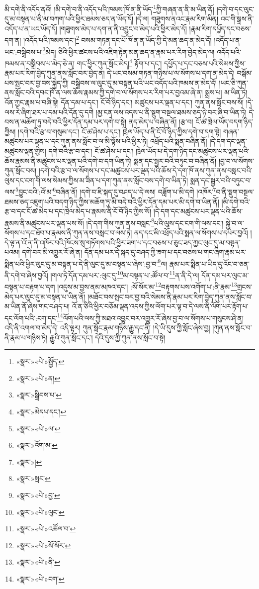 མི་དགེ་ནི་འདོད་ནའོ། །མི་དགེ་བ་ནི་འདོད་པའི་ཁམས་ཁོ་ན་ནི་ཡོད་\footnote{«སྣར་»«པེ་»སྤྱོད་}ཀྱི་གཞན་ན་ནི་མ་ཡིན་ནོ། །དགེ་བ་དང་ལུང་དུ་མ་བསྟན་པ་ནི་མ་བཀག་པའི་ཕྱིར་ཐམས་ཅད་ན་ཡོད་དོ། །དེ་ལ། གཟུགས་ནའང་རྣམ་རིག་མིན། འང་གི་སྒྲས་ནི་འདོད་པ་ན་ཡང་ཡོད་དོ། །གཟུགས་མེད་པ་དག་ན་ནི་འབྱུང་བ་མེད་པའི་ཕྱིར་མེད་དོ། །རྣམ་རིག་དཔྱོད་དང་བཅས་དག་ན། །འདོད་པའི་ཁམས་དང་།\footnote{«སྣར་»«པེ་»ན།} བསམ་གཏན་དང་པོ་ཁོ་ན་ན་ཡོད་ཀྱི་དེ་མན་ཆད་ན་མེད་དོ། །འདོད་པ་ན་ཡང་:བསྒྲིབས་པ་\footnote{«སྣར་»སྒྲིབས་པ་}མེད། ཅིའི་ཕྱིར་ཚངས་པའི་འཇིག་རྟེན་མན་ཆད་ན་རྣམ་པར་རིག་བྱེད་མེད་ལ། འདོད་པའི་ཁམས་ན་བསྒྲིབས་པ་མེད་ཅེ་ན། གང་ཕྱིར་ཀུན་སློང་མེད།\footnote{«སྣར་»མེདཔ་དང་།} རྟོག་པ་དང་། དཔྱོད་པ་དང་བཅས་པའི་སེམས་ཀྱིས་རྣམ་པར་རིག་བྱེད་ཀུན་ནས་སློང་བར་བྱེད་ན། དེ་ཡང་བསམ་གཏན་གཉིས་པ་ལ་སོགས་པ་དག་ན་མེད་དེ། བསྒོམ་པས་སྤང་བར་བྱ་བས་སྐྱེད་ཀྱི། བསྒྲིབས་ལ་ལུང་དུ་མ་བསྟན་པའི་ཡང་འདོད་པའི་ཁམས་ན་མེད་དོ། །ཡང་ཅི་ཀུན་ནས་སློང་བའི་དབང་ཁོ་ན་ལས་ཆོས་རྣམས་ཀྱི་དགེ་བ་ལ་སོགས་པར་རིག་པར་བྱའམ་ཞེ་ན། སྨྲས་པ། མ་ཡིན་ཏེ། འོན་ཀྱང་རྣམ་པ་བཞི་སྟེ། དོན་དམ་པ་དང་། ངོ་བོ་ཉིད་དང་། མཚུངས་པར་ལྡན་པ་དང་། ཀུན་ནས་སློང་བས་སོ། །དེ་ལས་རེ་ཞིག་ཐར་པ་དམ་པའི་དོན་དུ་དགེ །མྱ་ངན་ལས་འདས་པ་ནི་སྡུག་བསྔལ་ཐམས་ཅད་ཉེ་བར་ཞི་བ་ཡིན་ཏེ། དེ་བས་ན་མཆོག་ཏུ་བདེ་བའི་ཕྱིར་དོན་དམ་པར་དགེ་བ་སྟེ། ནད་མེད་པ་བཞིན་ནོ། །རྩ་བ། ངོ་ཚ་ཁྲེལ་ཡོད་བདག་ཉིད་ཀྱིས། །དགེ་བའི་རྩ་བ་གསུམ་དང་། ངོ་ཚ་ཤེས་པ་དང་། ཁྲེལ་ཡོད་པ་ནི་ངོ་བོ་ཉིད་ཀྱིས་དགེ་བ་དག་སྟེ། གཞན་མཚུངས་པར་ལྡན་པ་དང་ཀུན་ནས་སློང་བ་ལ་མི་ལྟོས་པའི་ཕྱིར་ཏེ། འཕྲོད་པའི་སྨན་བཞིན་ནོ། །དེ་དག་དང་ལྡན་མཚུངས་ལྡན་གྱིས། དགེ་བའི་རྩ་བ་དང་། ངོ་ཚ་ཤེས་པ་དང་། ཁྲེལ་ཡོད་པ་དེ་དག་ཉིད་དང་མཚུངས་པར་ལྡན་པའི་ཆོས་རྣམས་ནི་མཚུངས་པར་ལྡན་པའི་དགེ་བ་དག་ཡིན་ཏེ། སྨན་དང་སྦྱར་བའི་བཏུང་བ་བཞིན་ནོ། །བྱ་བ་ལ་སོགས་ཀུན་སློང་བས། །དགེ་བའི་རྩ་བ་ལ་སོགས་པ་དང་མཚུངས་པར་ལྡན་པའི་ཆོས་དེ་དག་ཁོ་ནས་ཀུན་ནས་བསླང་བའི་ལུས་དང་ངག་གི་ལས་སེམས་ཀྱིས་མ་ཟིན་པ་དག་ཀུན་ནས་སློང་བས་དགེ་བ་ཡིན་ཏེ། སྨན་དང་སྦྱར་བའི་བཏུང་བ་ལས་\footnote{«སྣར་»«པེ་»ལ་}བྱུང་བའི་:འོ་མ་\footnote{«སྣར་»འོག་མ་}བཞིན་ནོ། །དགེ་བ་ཇི་སྐད་དུ་བཤད་པ་དེ་ལས། བཟློག་པ་མི་དགེ །འཁོར་\footnote{«སྣར་»།}བ་ནི་སྡུག་བསྔལ་ཐམས་ཅད་འཇུག་པའི་བདག་ཉིད་ཀྱིས་མཆོག་ཏུ་མི་བདེ་བའི་ཕྱིར་དོན་དམ་པར་མི་དགེ་བ་ཡིན་ནོ། །མི་དགེ་བའི་རྩ་བ་དང་ངོ་ཚ་མེད་པ་དང་ཁྲེལ་མེད་པ་རྣམས་ནི་ངོ་བོ་ཉིད་ཀྱིས་སོ། །དེ་དག་དང་མཚུངས་པར་ལྡན་པའི་ཆོས་རྣམས་ནི་མཚུངས་པར་ལྡན་པས་སོ། །དེ་དག་གིས་ཀུན་ནས་བསླང་\footnote{«སྣར་»སླང་}པའི་ལུས་དང་ངག་གི་ལས་དང་། སྐྱེ་བ་ལ་སོགས་པ་དང་ཐོབ་པ་རྣམས་ནི་ཀུན་ནས་བསླང་བ་ལས་ཏེ། ནད་དང་མི་འཕྲོད་པའི་སྨན་ལ་སོགས་པ་དཔེར་བྱའོ། །དེ་ལྟ་ན་འོ་ན་ནི་འཁོར་བའི་ཁོངས་སུ་གཏོགས་པའི་ཕྱིར་ཟག་པ་དང་བཅས་པ་ཅུང་ཟད་ཀྱང་ལུང་དུ་མ་བསྟན་པའམ། དགེ་བར་མི་འགྱུར་རོ་ཞེ་ན། དོན་དམ་པར་དེ་སྐད་དུ་བཤད་ཀྱི་ཟག་པ་དང་བཅས་པ་གང་ཞིག་རྣམ་པར་སྨིན་པའི་ཕྱིར་ལུང་དུ་མ་བསྟན་པ་དེ་ནི་ལུང་དུ་མ་བསྟན་པ་ཞེས་:བྱ་བ་\footnote{«སྣར་»«པེ་»བྱ་}ལ། རྣམ་པར་སྨིན་པ་ཡིད་དུ་འོང་བ་ཅན་ནི་དགེ་བ་ཞེས་བྱའོ། །གལ་ཏེ་དོན་དམ་པར་:ལུང་དུ་\footnote{«སྣར་»«པེ་»ལུང་}མ་བསྟན་པ་:ཚོལ་བ་\footnote{«སྣར་»«པེ་»འཚོལ་བ་}ན་ནི་དེ་ལ། དོན་དམ་པར་ལུང་མ་བསྟན་པ་བརྟག་པ་དག །འདུས་མ་བྱས་ནམ་མཁའ་དང་། :སོ་སོར་མ་\footnote{«སྣར་»«པེ་»སོ་སོར་}བརྟགས་པས་འགོག་པ་:ནི་རྣམ་\footnote{«སྣར་»«པེ་»ནི་}གྲངས་མེད་པར་ལུང་དུ་མ་བསྟན་པ་ཡིན་ནོ། །མཐོང་བས་སྤང་བར་བྱ་བའི་སེམས་ནི་རྣམ་པར་རིག་བྱེད་ཀུན་ནས་སློང་བ་མ་ཡིན་ནོ་ཞེས་གང་བཤད་པ། འོ་ན་ཅིའི་ཕྱིར་བཅོམ་ལྡན་འདས་ཀྱིས་ལོག་པར་ལྟ་བ་དེ་ལས་ནི་ལོག་པར་རྟོག་པ་དང་ལོག་པའི་:ངག་དང་\footnote{«སྣར་»«པེ་»ངག་}ལོག་པའི་ལས་ཀྱི་མཐའ་འབྱུང་བར་འགྱུར་རོ་ཞེས་བྱ་བ་ལ་སོགས་པ་གསུངས་ཤེ་ན། འདི་ནི་འགལ་བ་མེད་དེ། འདི་ལྟར། ཀུན་སློང་རྣམ་གཉིས་རྒྱུ་དང་ནི། །དེ་ཡི་དུས་ཀྱི་སློང་ཞེས་བྱ། །ཀུན་ནས་སློང་བ་ནི་རྣམ་པ་གཉིས་ཏེ། རྒྱུའི་ཀུན་སློང་དང་། དེའི་དུས་ཀྱི་ཀུན་ནས་སློང་བ་སྟེ། 